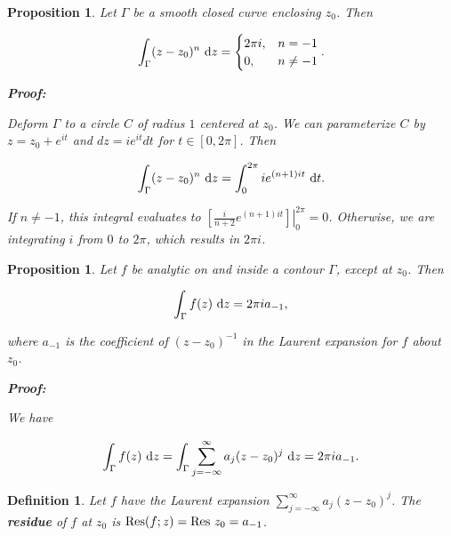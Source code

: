 \documentclass{article}
\theoremstyle{colontheorem}
\newtheorem{proposition}[theorem]{Proposition}
\newtheorem{definition}[theorem]{Definition}
\newcommand{\Res}{\textnormal{Res}}
\newenvironment{Proposition}
{
	\begin{mdframed}[backgroundcolor=TheoremOrange!10]
	\begin{proposition}
}
{
	\end{proposition}
	\end{mdframed}
	
	\vspace{.15in}
}
\newenvironment{Def}
{
	\begin{mdframed}[backgroundcolor=DefGreen!10]
	\begin{definition}
}
{
	\end{definition}
	\end{mdframed}
	
	\vspace{.15in}
}
\newenvironment{Proof}
{
	\begin{mdframed}[backgroundcolor=ProofPurple!10]
	\textbf{Proof:}%
}
{
	\end{mdframed}
	
	\vspace{.085in}
}
\begin{document}
\begin{Proposition}
	
	Let $\Gamma$ be a smooth closed curve enclosing $z_0$. Then
	
	$$
		\int_\Gamma (z - z_0)^n\ \textnormal{d}z = \begin{cases}
		2 \pi i, & n = -1\\
		0, & n \neq -1
		\end{cases}.
	$$
	
	\begin{Proof}
		Deform $\Gamma$ to a circle $C$ of radius $1$ centered at $z_0$. We can parameterize $C$ by $z = z_0 + e^{it}$ and $dz = ie^{it} dt$ for $t \in [0, 2\pi]$. Then
		
		$$
			\int_\Gamma (z - z_0)^n\ \textnormal{d}z = \int_0^{2 \pi} i e^{(n+1) it}\ \textnormal{d}t.
		$$
		
		If $n \neq -1$, this integral evaluates to $\left. \left[ \frac{i}{n + 2} e^{(n+1) it} \right] \right|_0^{2 \pi} = 0$. Otherwise, we are integrating $i$ from $0$ to $2\pi$, which results in $2 \pi i$.
		
	\end{Proof}
	
\end{Proposition}



\begin{Proposition}
	
	Let $f$ be analytic on and inside a contour $\Gamma$, except at $z_0$. Then
	
	$$
		\int_\Gamma f(z)\ \textnormal{d}z = 2 \pi i a_{-1} \textnormal{,}
	$$
	
	where $a_{-1}$ is the coefficient of $(z - z_0)^{-1}$ in the Laurent expansion for $f$ about $z_0$.
	
	\begin{Proof}
		We have
		
		$$
			\int_\Gamma f(z)\ \textnormal{d}z = \int_\Gamma \displaystyle\sum\limits_{j = -\infty}^{\infty} a_j (z - z_0)^j\ \textnormal{d}z = 2 \pi i a_{-1}.
		$$
		
	\end{Proof}
	
\end{Proposition}



\begin{Def}
	
	Let $f$ have the Laurent expansion $\displaystyle\sum\limits_{j=-\infty}^\infty a_j (z - z_0)^j$. The \textbf{residue} of $f$ at $z_0$ is $\Res(f; z) = \Res\ z_0 = a_{-1}$.
	
\end{Def}
\end{document}
